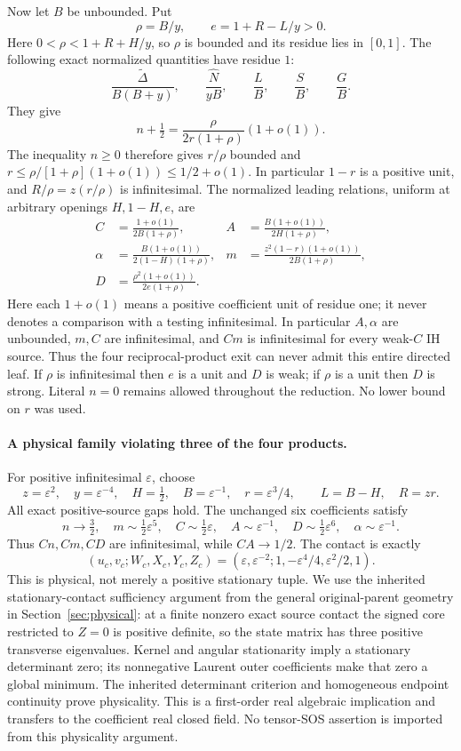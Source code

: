 Now let $B$ be unbounded. Put
\[
 \rho=B/y,\qquad e=1+R-L/y>0.
\]
Here $0<\rho<1+R+H/y$, so $\rho$ is bounded and its residue
lies in $[0,1]$. The following exact normalized quantities have
residue $1$:
\[
 \frac{\widetilde\Delta}{B(B+y)},\qquad
 \frac{\widehat N}{yB},\qquad
 \frac{L}{B},\qquad \frac{S}{B},\qquad\frac{G}{B}.
                                                        \tag{WI2}
\]
They give
\[
 n+\tfrac12=\frac{\rho}{2r(1+\rho)}(1+o(1)).
\]
The inequality $n\ge0$ therefore gives $r/\rho$ bounded and
$r\le\rho/[1+\rho](1+o(1))\le1/2+o(1)$.
In particular $1-r$ is a positive unit, and
$R/\rho=z(r/\rho)$ is infinitesimal. The normalized leading
relations, uniform at arbitrary openings $H,1-H,e$, are
\begin{align*}
 C&=\frac{1+o(1)}{2B(1+\rho)},&
 A&=\frac{B(1+o(1))}{2H(1+\rho)},\\
 \alpha&=\frac{B(1+o(1))}{2(1-H)(1+\rho)},&
 m&=\frac{z^2(1-r)(1+o(1))}{2B(1+\rho)},\\
 D&=\frac{\rho^2(1+o(1))}{2e(1+\rho)}.
                                                        \tag{WI3}
\end{align*}
Here each $1+o(1)$ means a positive coefficient unit of residue one;
it never denotes a comparison with a testing infinitesimal. In
particular $A,\alpha$ are unbounded, $m,C$ are infinitesimal, and
$Cm$ is infinitesimal for every weak-$C$ IH source. Thus the four
reciprocal-product exit can never admit this entire directed leaf.
If $\rho$ is infinitesimal then $e$ is a unit and $D$ is weak;
if $\rho$ is a unit then $D$ is strong. Literal $n=0$ remains
allowed throughout the reduction. No lower bound on $r$ was used.

\paragraph{A physical family violating three of the four products.}
For positive infinitesimal $\varepsilon$, choose
\[
 z=\varepsilon^2,\quad y=\varepsilon^{-4},\quad
 H=\tfrac12,\quad B=\varepsilon^{-1},\quad r=\varepsilon^3/4,
 \qquad L=B-H,\quad R=zr.
\]
All exact positive-source gaps hold. The unchanged six coefficients
satisfy
\[
 n\to\tfrac32,\quad m\sim\tfrac12\varepsilon^5,\quad
 C\sim\tfrac12\varepsilon,\quad A\sim\varepsilon^{-1},\quad
 D\sim\tfrac12\varepsilon^6,\quad\alpha\sim\varepsilon^{-1}.
\]
Thus $Cn,Cm,CD$ are infinitesimal, while $CA\to1/2$.
The contact is exactly
\[
 (u_c,v_c;W_c,X_c,Y_c,Z_c)
 =(\varepsilon,\varepsilon^{-2};1,-\varepsilon^4/4,
   \varepsilon^2/2,1).
\]
This is physical, not merely a positive stationary tuple. We use the
inherited stationary-contact sufficiency argument from the general
original-parent geometry in Section~\ref{sec:physical}:
at a finite nonzero exact source contact the signed core restricted to
$Z=0$ is positive definite, so the state matrix has three positive
transverse eigenvalues. Kernel and angular stationarity imply a
stationary determinant zero; its nonnegative Laurent outer
coefficients make that zero a global minimum. The inherited determinant
criterion and homogeneous endpoint continuity prove physicality.
This is a first-order real algebraic implication and transfers to the
coefficient real closed field. No tensor-SOS assertion is imported
from this physicality argument.


